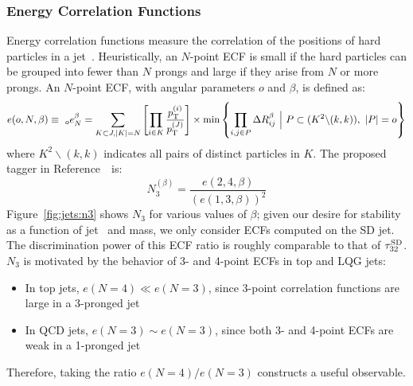 \subsubsection{Energy Correlation Functions}

Energy correlation functions measure the correlation of the positions of hard particles in a jet~\needcite. 
Heuristically, an $N$-point ECF is small if the hard particles can be grouped into fewer than $N$ prongs and large if they arise from $N$ or more prongs. 
An $N$-point ECF, with angular parameters $o$ and $\beta$, is defined as:
\begin{equation}
    e(o,N,\beta) \equiv 
    ~_o e_N^\beta = 
    \sum _{K\subset J, |K|=N} 
    \left[\prod_{i\in K} \frac{p_\mathrm{T}^{(i)}}{p_\mathrm{T}^{(J)}}\right] \times 
    \min\left\{ \prod_{i,j\in P} \Delta R_{ij}^\beta 
        ~\Big|~ P \subset (K^2 \backslash (k,k)),~|P|=o\right\}
\end{equation}
where $K^2\backslash(k,k)$ indicates all pairs of distinct particles in $K$. 
The proposed tagger in Reference~\needcite~is:
\begin{equation}
    N_3^{(\beta)} = \frac{e(2,4,\beta)}{(e(1,3,\beta))^2}
\end{equation}
Figure~\ref{fig:jets:n3} shows $N_3$ for various values of $\beta$; given our desire for stability as a function of jet \pt~and mass, we only consider ECFs computed on the SD jet. 
The discrimination power of this ECF ratio is roughly comparable to that of $\tau_{32}^{\mathrm{SD}}$. 
$N_3$ is motivated by the behavior of 3- and 4-point ECFs in top and LQG jets:
\begin{itemize}
    \item In top jets, $e(N=4) \ll e(N=3)$, since 3-point correlation functions are large in a 3-pronged jet
    \item In QCD jets, $e(N=3) \sim e(N=3)$, since both 3- and 4-point ECFs are weak in a 1-pronged jet
\end{itemize}
Therefore, taking the ratio $e(N=4)/e(N=3)$ constructs a useful observable. 


